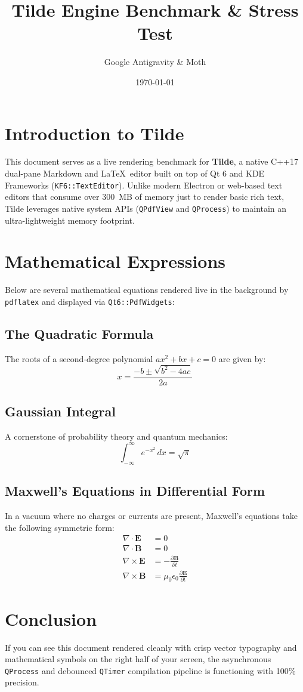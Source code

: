 \documentclass{article}
\title{Tilde Engine Benchmark & Stress Test}
\author{Google Antigravity & Moth}
\date{\today}
\begin{document}
\maketitle

\section{Introduction to Tilde}
This document serves as a live rendering benchmark for \textbf{Tilde}, a native C++17 dual-pane Markdown and \LaTeX\ editor built on top of Qt 6 and KDE Frameworks (\texttt{KF6::TextEditor}). Unlike modern Electron or web-based text editors that consume over 300~MB of memory just to render basic rich text, Tilde leverages native system APIs (\texttt{QPdfView} and \texttt{QProcess}) to maintain an ultra-lightweight memory footprint.

\section{Mathematical Expressions}
Below are several mathematical equations rendered live in the background by \texttt{pdflatex} and displayed via \texttt{Qt6::PdfWidgets}:

\subsection{The Quadratic Formula}
The roots of a second-degree polynomial $ax^2 + bx + c = 0$ are given by:
\[
x = \frac{-b \pm \sqrt{b^2 - 4ac}}{2a}
\]

\subsection{Gaussian Integral}
A cornerstone of probability theory and quantum mechanics:
\[
\int_{-\infty}^{\infty} e^{-x^2} \, dx = \sqrt{\pi}
\]

\subsection{Maxwell's Equations in Differential Form}
In a vacuum where no charges or currents are present, Maxwell's equations take the following symmetric form:
\begin{align}
\nabla \cdot \mathbf{E} &= 0 \\
\nabla \cdot \mathbf{B} &= 0 \\
\nabla \times \mathbf{E} &= -\frac{\partial \mathbf{B}}{\partial t} \\
\nabla \times \mathbf{B} &= \mu_0 \epsilon_0 \frac{\partial \mathbf{E}}{\partial t}
\end{align}

\section{Conclusion}
If you can see this document rendered cleanly with crisp vector typography and mathematical symbols on the right half of your screen, the asynchronous \texttt{QProcess} and debounced \texttt{QTimer} compilation pipeline is functioning with 100\% precision.
\end{document}
